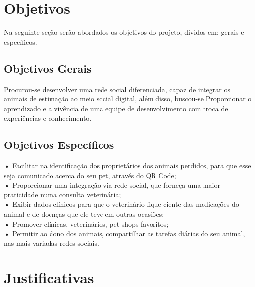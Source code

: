\section{Objetivos}
Na seguinte seção serão abordados os objetivos do projeto, dividos em: gerais e específicos.
\subsection{Objetivos Gerais}
Procurou-se desenvolver uma rede social diferenciada, capaz de integrar os animais de estimação ao meio social digital, além disso, buscou-se Proporcionar o aprendizado e a vivência de uma equipe de desenvolvimento com troca de experiências e conhecimento.

\subsection{Objetivos Específicos}
\textbf{•} Facilitar na identificação dos proprietários dos animais perdidos, para que esse seja comunicado acerca do seu pet, através do QR Code;
\\
\indent
\textbf{•} Proporcionar uma integração via rede social, que forneça uma maior praticidade numa consulta veterinária;
\\
\indent
\textbf{•} Exibir dados clínicos para que o veterinário fique ciente das medicações do animal e de doenças que ele teve em outras ocasiões;
\\
\indent
\textbf{•} Promover clínicas, veterinários, pet shops favoritos;
\\
\indent
\textbf{•} Permitir ao dono dos animais, compartilhar as tarefas diárias do seu animal, nas mais variadas redes sociais.

\section{Justificativas}

